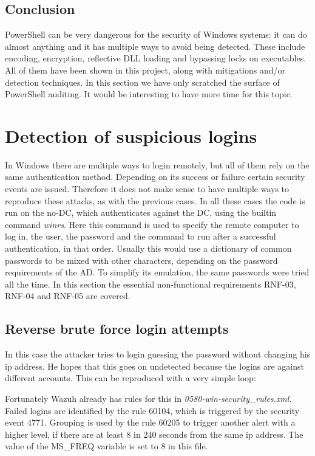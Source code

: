 \subsection{Conclusion}
PowerShell can be very dangerous for the security of Windows systems: it can do almost anything and it has multiple ways to avoid being detected.
These include encoding, encryption, reflective DLL loading and bypassing locks on executables.
All of them have been shown in this project, along with mitigations and/or detection techniques.
\linej
In this section we have only scratched the surface of PowerShell auditing. It would be interesting to have more time for this topic.

\section{Detection of suspicious logins}
In Windows there are multiple ways to login remotely, but all of them rely on the same authentication method. Depending on its success or failure certain security events are issued. Therefore it does not make sense to have multiple ways to reproduce these attacks, as with the previous cases.
\linej
In all these cases the code is run on the no-DC, which authenticates against the DC, using the builtin command \textit{winrs}\cite{winrs}. Here this command is used to specify the remote computer to log in, the user, the password and the command to run after a successful authentication, in that order.
\linej
\linej
Usually this would use a dictionary of common passwords to be mixed with other characters, depending on the password requirements of the AD.
To simplify its emulation, the same passwords were tried all the time.
\linej
\linej
In this section the essential non-functional requirements RNF-03, RNF-04 and RNF-05 are covered.

\subsection{Reverse brute force login attempts} \label{reverse_login}
In this case the attacker tries to login guessing the password without changing his ip address.
He hopes that this goes on undetected because the logins are against different accounts.
\linej
This can be reproduced with a very simple loop:

\linej
Fortunately Wazuh already has rules for this in \textit{0580-win-security\_rules.xml}\cite{wazuh_ruleset}.
Failed logins are identified by the rule 60104, which is triggered by the security event 4771\cite{windows_events}.
Grouping is used by the rule 60205 to trigger another alert with a higher level, if there are at least 8 in 240 seconds from the same ip address.
The value of the MS\_FREQ variable is set to 8 in this file.
\linej


